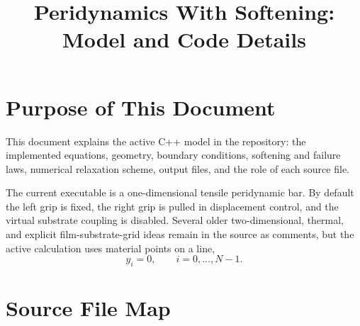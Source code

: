 \documentclass[11pt]{article}
\title{Peridynamics With Softening: Model and Code Details}
\author{}
\date{}
\begin{document}
\maketitle
\tableofcontents
\newpage

\section{Purpose of This Document}

This document explains the active C++ model in the repository: the implemented
equations, geometry, boundary conditions, softening and failure laws, numerical
relaxation scheme, output files, and the role of each source file.

The current executable is a one-dimensional tensile peridynamic bar. By default
the left grip is fixed, the right grip is pulled in displacement control, and
the virtual substrate coupling is disabled. Several older two-dimensional,
thermal, and explicit film-substrate-grid ideas remain in the source as
comments, but the active calculation uses material points on a line,
\begin{equation}
    y_i = 0,
    \qquad
    i = 0,\ldots,N-1 .
\end{equation}

\section{Source File Map}
\end{document}
